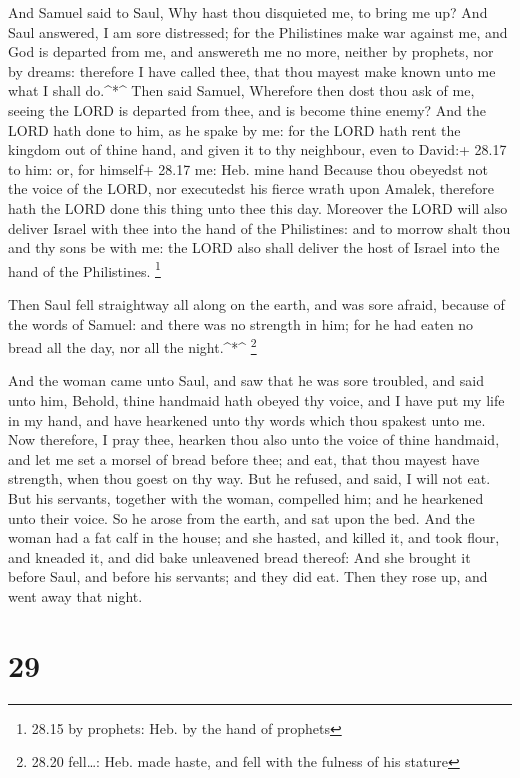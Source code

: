  And Samuel said to Saul, Why hast thou disquieted me, to
bring me up? And Saul answered, I am sore distressed; for the
Philistines make war against me, and God is departed from me, and
answereth me no more, neither by prophets, nor by dreams: therefore I
have called thee, that thou mayest make known unto me what I shall
do.\^{}*\^{}  Then said Samuel, Wherefore then dost thou
ask of me, seeing the LORD is departed from thee, and is become thine
enemy?  And the LORD hath done to him, as he spake by me:
for the LORD hath rent the kingdom out of thine hand, and given it to
thy neighbour, even to David:+ 28.17 to him: or, for himself+ 28.17 me:
Heb. mine hand  Because thou obeyedst not the voice of the
LORD, nor executedst his fierce wrath upon Amalek, therefore hath the
LORD done this thing unto thee this day.  Moreover the LORD
will also deliver Israel with thee into the hand of the Philistines: and
to morrow shalt thou and thy sons be with me: the LORD also shall
deliver the host of Israel into the hand of the Philistines. \footnote{28.15
  by prophets: Heb. by the hand of prophets}

 Then Saul fell straightway all along on the earth, and was
sore afraid, because of the words of Samuel: and there was no strength
in him; for he had eaten no bread all the day, nor all the
night.\^{}*\^{} \footnote{28.20 fell\ldots: Heb. made haste, and fell
  with the fulness of his stature}

 And the woman came unto Saul, and saw that he was sore
troubled, and said unto him, Behold, thine handmaid hath obeyed thy
voice, and I have put my life in my hand, and have hearkened unto thy
words which thou spakest unto me.  Now therefore, I pray
thee, hearken thou also unto the voice of thine handmaid, and let me set
a morsel of bread before thee; and eat, that thou mayest have strength,
when thou goest on thy way.  But he refused, and said, I
will not eat. But his servants, together with the woman, compelled him;
and he hearkened unto their voice. So he arose from the earth, and sat
upon the bed.  And the woman had a fat calf in the house;
and she hasted, and killed it, and took flour, and kneaded it, and did
bake unleavened bread thereof:  And she brought it before
Saul, and before his servants; and they did eat. Then they rose up, and
went away that night.

\hypertarget{section-28}{%
\section{29}\label{section-28}}

